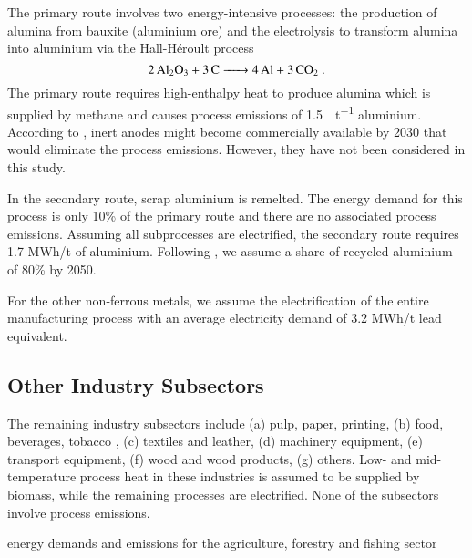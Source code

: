 The primary route involves two energy-intensive processes: the production of
alumina from bauxite (aluminium ore) and the electrolysis to transform alumina
into aluminium via the  Hall-H\'{e}roult process
\begin{equation}
    \ce{2Al2O3 + 3C -> 4Al + 3\co}.
\end{equation}
The primary route requires high-enthalpy heat  to produce
alumina which is supplied by methane and causes process emissions of
\SI{1.5}{\tco\per\tonne} aluminium. According to  ,
inert anodes might become commercially available by 2030 that would eliminate
the process emissions. However, they have not been considered in this study.

In the secondary route, scrap aluminium is remelted. The energy demand for this
process is only 10\% of the primary route and there are no associated process
emissions. Assuming all subprocesses are electrified, the secondary route
requires 1.7 MWh/t of aluminium. Following , we assume
a share of recycled aluminium of 80\% by 2050.

For the other non-ferrous metals, we assume the electrification of the entire
manufacturing process with an average electricity demand of 3.2 MWh/t lead
equivalent. 

\subsection{Other Industry Subsectors}
\label{sec:si:industry:other}

The remaining industry subsectors include
(a) pulp, paper, printing,
(b) food, beverages, tobacco ,
(c) textiles and leather,
(d) machinery equipment,
(e) transport equipment,
(f) wood and wood products,
(g) others.
Low- and mid-temperature process heat in these industries is assumed to be supplied by biomass,
while the remaining processes are electrified.
None of the subsectors involve process emissions.


energy demands and \co emissions for the agriculture, forestry and fishing
sector


